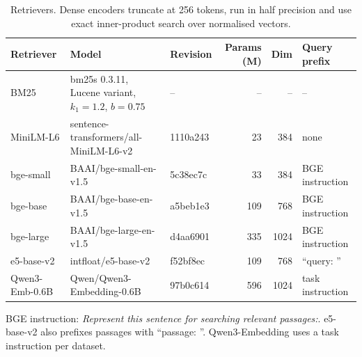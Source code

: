 \begin{table}[t]
\centering
\footnotesize
\setlength{\tabcolsep}{3.5pt}
\caption{Retrievers. Dense encoders truncate at 256 tokens, run in half precision and use exact inner-product search over normalised vectors.}
\label{tab:models}
\begin{tabular}{lllrrl}
\toprule
Retriever & Model & Revision & Params (M) & Dim & Query prefix \\
\midrule
BM25 & bm25s 0.3.11, Lucene variant, $k_1=1.2$, $b=0.75$ & -- & -- & -- & -- \\
MiniLM-L6 & sentence-transformers/all-MiniLM-L6-v2 & 1110a243 & 23 & 384 & none \\
bge-small & BAAI/bge-small-en-v1.5 & 5c38ec7c & 33 & 384 & BGE instruction \\
bge-base & BAAI/bge-base-en-v1.5 & a5beb1e3 & 109 & 768 & BGE instruction \\
bge-large & BAAI/bge-large-en-v1.5 & d4aa6901 & 335 & 1024 & BGE instruction \\
e5-base-v2 & intfloat/e5-base-v2 & f52bf8ec & 109 & 768 & ``query: '' \\
Qwen3-Emb-0.6B & Qwen/Qwen3-Embedding-0.6B & 97b0c614 & 596 & 1024 & task instruction \\
\bottomrule
\end{tabular}
\par\smallskip\parbox{\linewidth}{\footnotesize BGE instruction: \emph{Represent this sentence for searching relevant passages:}. e5-base-v2 also prefixes passages with ``passage: ''. Qwen3-Embedding uses a task instruction per dataset.}
\end{table}
